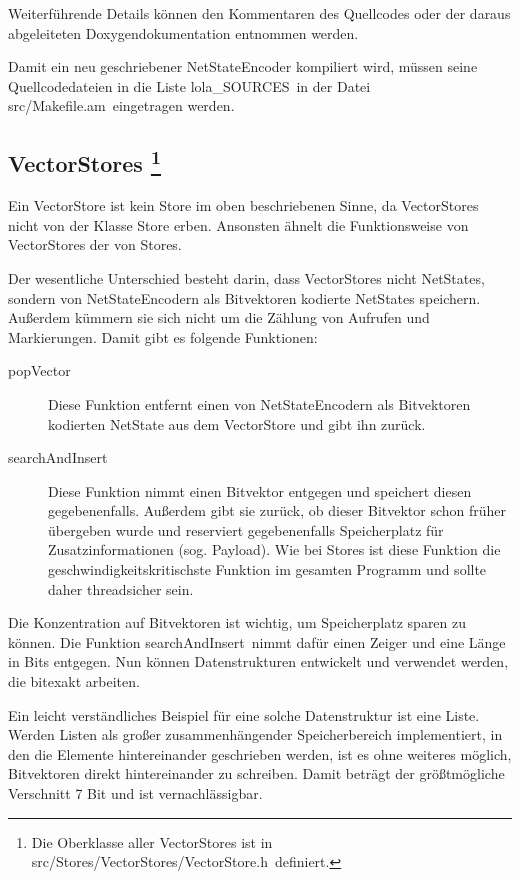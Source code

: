 \documentclass[12pt,a4paper,titlepage]{scrartcl}
\renewcommand \( {\left (}
\renewcommand \) {\right )}
\renewcommand \[ {\left [}
\renewcommand \] {\right ]}
\newcommand \Flqq {\flqq\ }
\begin{document}
Weiterführende Details können den Kommentaren des Quellcodes oder der daraus abgeleiteten Doxygendokumentation entnommen werden.

Damit ein neu geschriebener NetStateEncoder kompiliert wird, müssen seine Quellcodedateien in die Liste \frqq lola\_SOURCES\Flqq in der Datei \frqq src/Makefile.am\Flqq eingetragen werden.

\subsection{VectorStores
\protect\footnote{Die Oberklasse aller VectorStores ist in \frqq src/Stores/VectorStores/VectorStore.h\Flqq definiert.}}
\label{kap:VectorStores}
Ein VectorStore ist kein Store im oben beschriebenen Sinne, da VectorStores nicht von der Klasse Store erben. Ansonsten ähnelt die Funktionsweise von VectorStores der von Stores.

Der wesentliche Unterschied besteht darin, dass VectorStores nicht NetStates, sondern von NetStateEncodern als Bitvektoren kodierte NetStates speichern. Außerdem kümmern sie sich nicht um die Zählung von Aufrufen und Markierungen. Damit gibt es folgende Funktionen:
\begin{description}
\item[popVector] Diese Funktion entfernt einen von NetStateEncodern als Bitvektoren kodierten NetState aus dem VectorStore und gibt ihn zurück. 
\item[searchAndInsert] Diese Funktion nimmt einen Bitvektor entgegen und speichert diesen gegebenenfalls. Außerdem gibt sie zurück, ob dieser Bitvektor schon früher übergeben wurde und reserviert gegebenenfalls Speicherplatz für Zusatzinformationen (sog. Payload). Wie bei Stores ist diese Funktion die geschwindigkeitskritischste Funktion im gesamten Programm und sollte daher threadsicher sein.
\end{description}
Die Konzentration auf Bitvektoren ist wichtig, um Speicherplatz sparen zu können. Die Funktion \frqq searchAndInsert\Flqq nimmt dafür einen Zeiger und eine Länge in Bits entgegen. Nun können Datenstrukturen entwickelt und verwendet werden, die bitexakt arbeiten.

Ein leicht verständliches Beispiel für eine solche Datenstruktur ist eine Liste. Werden Listen als großer zu\-sammen\-hängen\-der Speicherbereich implementiert, in den die Elemente hintereinander geschrieben werden, ist es ohne weiteres möglich, Bitvektoren direkt hintereinander zu schreiben. Damit beträgt der größtmögliche Verschnitt 7 Bit und ist vernachlässigbar.
\end{document}
